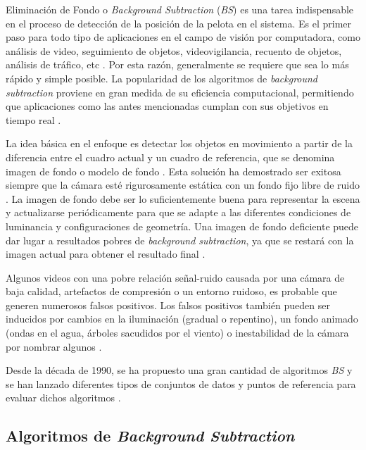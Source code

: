 Eliminación de Fondo o \textit{Background Subtraction} (\textit{BS}) es una tarea indispensable en el proceso de detección de la posición de la pelota en el sistema. Es el primer paso para todo tipo de aplicaciones en el campo de visión por computadora, como análisis de video, seguimiento de objetos, videovigilancia, recuento de objetos, análisis de tráfico, etc \cite{GuangleTaoJiandanPingWenwu}. Por esta razón, generalmente se requiere que sea lo más rápido y simple posible. La popularidad de los algoritmos de \textit{background subtraction} proviene en gran medida de su eficiencia computacional, permitiendo que aplicaciones como las antes mencionadas cumplan con sus objetivos en tiempo real \cite{DeepjoySarat}.

La idea básica en el enfoque es detectar los objetos en movimiento a partir de la diferencia entre el cuadro actual y un cuadro de referencia, que se denomina imagen de fondo o modelo de fondo \cite{DeepjoySarat}. Esta solución ha demostrado ser exitosa siempre que la cámara esté rigurosamente estática con un fondo fijo libre de ruido \cite{YannickPierreMarcBrunoHeleneChristophe}. La imagen de fondo debe ser lo suficientemente buena para representar la escena y actualizarse periódicamente para que se adapte a las diferentes condiciones de luminancia y configuraciones de geometría. Una imagen de fondo deficiente puede dar lugar a resultados pobres de \textit{background subtraction}, ya que se restará con la imagen actual para obtener el resultado final \cite{DeepjoySarat}.

Algunos videos con una pobre relación señal-ruido causada por una cámara de baja calidad, artefactos de compresión o un entorno ruidoso, es probable que generen numerosos falsos positivos. Los falsos positivos también pueden ser inducidos por cambios en la iluminación (gradual o repentino), un fondo animado (ondas en el agua, árboles sacudidos por el viento) o inestabilidad de la cámara por nombrar algunos \cite{YannickPierreMarcBrunoHeleneChristophe}.

Desde la década de 1990, se ha propuesto una gran cantidad de algoritmos \textit{BS} y se han lanzado diferentes tipos de conjuntos de datos y puntos de referencia para evaluar dichos algoritmos \cite{GuangleTaoJiandanPingWenwu}.

\subsection{Algoritmos de \textit{Background Subtraction}}

